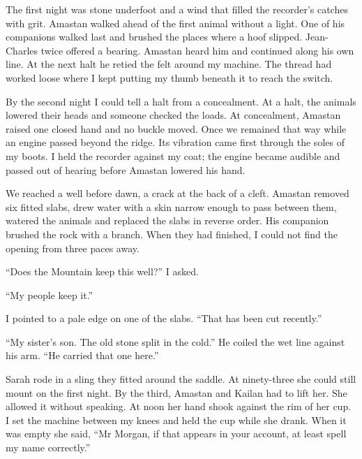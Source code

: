 The first night was stone underfoot and a wind that filled the recorder's catches with grit. Amastan walked ahead of the first animal without a light. One of his companions walked last and brushed the places where a hoof slipped. Jean-Charles twice offered a bearing. Amastan heard him and continued along his own line. At the next halt he retied the felt around my machine. The thread had worked loose where I kept putting my thumb beneath it to reach the switch.\par

By the second night I could tell a halt from a concealment. At a halt, the animals lowered their heads and someone checked the loads. At concealment, Amastan raised one closed hand and no buckle moved. Once we remained that way while an engine passed beyond the ridge. Its vibration came first through the soles of my boots. I held the recorder against my coat; the engine became audible and passed out of hearing before Amastan lowered his hand.\par

We reached a well before dawn, a crack at the back of a cleft. Amastan removed six fitted slabs, drew water with a skin narrow enough to pass between them, watered the animals and replaced the slabs in reverse order. His companion brushed the rock with a branch. When they had finished, I could not find the opening from three paces away.\par

``Does the Mountain keep this well?'' I asked.\par

``My people keep it.''\par

I pointed to a pale edge on one of the slabs. ``That has been cut recently.''\par

``My sister's son. The old stone split in the cold.'' He coiled the wet line against his arm. ``He carried that one here.''\par

Sarah rode in a sling they fitted around the saddle. At ninety-three she could still mount on the first night. By the third, Amastan and Kailan had to lift her. She allowed it without speaking. At noon her hand shook against the rim of her cup. I set the machine between my knees and held the cup while she drank. When it was empty she said, ``Mr Morgan, if that appears in your account, at least spell my name correctly.''\par

